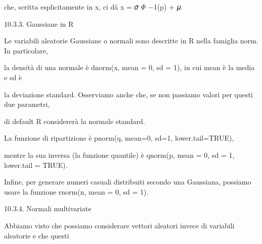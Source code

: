 \documentclass[a4paper,portrait,12pt]{article}
\begin{document}
\begin{flushleft}
che, scritta esplicitamente in x, ci d\`{a} x = 𝜎 $\Phi$ $-$1(p) + 𝜇.
\end{flushleft}





\begin{flushleft}
10.3.3. Gaussiane in R
\end{flushleft}


\begin{flushleft}
Le variabili aleatorie Gaussiane o normali sono descritte in R nella famiglia norm. In particolare,
\end{flushleft}


\begin{flushleft}
la densit\`{a} di una normale \`{e} dnorm(x, mean = 0, sd = 1), in cui mean \`{e} la media e sd \`{e}
\end{flushleft}


\begin{flushleft}
la deviazione standard. Osserviamo anche che, se non passiamo valori per questi due parametri,
\end{flushleft}


\begin{flushleft}
di default R considerer\`{a} la normale standard.
\end{flushleft}


\begin{flushleft}
La funzione di ripartizione \`{e} pnorm(q, mean=0, sd=1, lower.tail=TRUE),
\end{flushleft}


\begin{flushleft}
mentre la sua inversa (la funzione quantile) \`{e} qnorm(p, mean = 0, sd = 1, lower.tail = TRUE).
\end{flushleft}


\begin{flushleft}
Infine, per generare numeri casuali distribuiti secondo una Gaussiana, possiamo usare la funzione rnorm(n, mean = 0, sd = 1).
\end{flushleft}





\begin{flushleft}
10.3.4. Normali multivariate
\end{flushleft}


\begin{flushleft}
Abbiamo visto che possiamo considerare vettori aleatori invece di variabili aleatorie e che questi
\end{flushleft}
\end{document}
